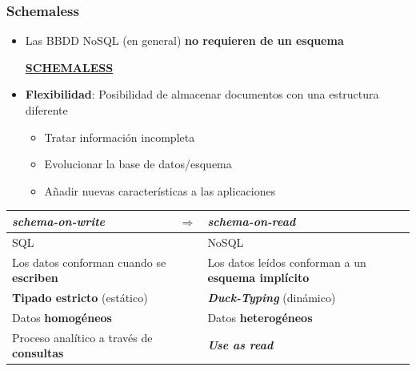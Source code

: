 \begin{frame}
  \frametitle{Schemaless}
\begin{itemize}
\item Las BBDD NoSQL (en general) {\bf no requieren de un esquema}
\begin{alertblock}{}
  \centering
  \href{https://farm6.staticflickr.com/5483/29931060254_109e3e36da_o_d.jpg}{\bf
    SCHEMALESS}
\end{alertblock}
\item {\bf Flexibilidad}: Posibilidad de almacenar documentos con una
  estructura diferente
\begin{itemize}
\item Tratar información incompleta
\item Evolucionar la base de datos/esquema
\item Añadir nuevas características a las aplicaciones
\end{itemize}
\end{itemize}

\framebreak

\begin{small}
\begin{tabular}{p{}cp{}}
{\bfseries\itshape schema-on-write}&$\Rightarrow$&{\bfseries\itshape
                                                   schema-on-read}\\
\midrule
\rowcolor{blue!20} SQL&&NoSQL\\
\rowcolor{blue!15} Los datos conforman cuando se {\bf escriben}&&Los datos leídos conforman a
                                               un {\bf esquema implícito}\\
\rowcolor{blue!20} {\bf Tipado estricto} (estático) && {\bfseries\itshape Duck-Typing}
                                    (dinámico) \\
\rowcolor{blue!15}  Datos {\bf homogéneos} && Datos {\bf heterogéneos}\\
\rowcolor{blue!20} Proceso analítico a través de {\bf consultas} && {\bfseries\itshape Use as read}\\
\end{tabular}
\end{small}


\end{frame}
